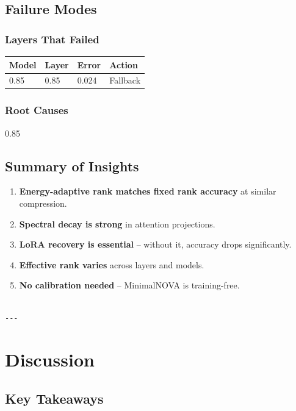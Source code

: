 \subsection{Failure Modes}

\subsubsection{Layers That Failed}

\begin{table}[H]
\centering
\small
\begin{tabular}{llll}
\toprule
\textbf{Model} & \textbf{Layer} & \textbf{Error} & \textbf{Action} \\
\midrule
0.85 & 0.85 & 0.024 & Fallback \\
\bottomrule
\end{tabular}
\end{table}

\subsubsection{Root Causes}

0.85

\subsection{Summary of Insights}

\begin{enumerate}
\item \textbf{Energy-adaptive rank matches fixed rank accuracy} at similar compression.
\item \textbf{Spectral decay is strong} in attention projections.
\item \textbf{LoRA recovery is essential} -- without it, accuracy drops significantly.
\item \textbf{Effective rank varies} across layers and models.
\item \textbf{No calibration needed} -- MinimalNOVA is training-free.
\end{enumerate}
\begin{lstlisting}

---
\end{lstlisting}


\section{Discussion}

\subsection{Key Takeaways}

